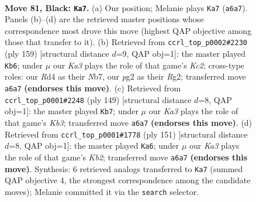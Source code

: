 \documentclass[11pt]{article}
\begin{document}
\clearpage

\begin{figure}[p]\centering
\begin{subfigure}{0.46\textwidth}\centering
\resizebox{\linewidth}{!}{%
\newchessgame
\chessboard[
  setfen={8/8/k7/6K1/3r4/1R6/1N4P1/8 b - - 27 81},
  showmover=false,
  pgfstyle=straightmove, color=movearrow, markmove={a6-a7}
]}
\caption{}
\end{subfigure}\hfill
\begin{subfigure}{0.46\textwidth}\centering
\resizebox{\linewidth}{!}{%
\newchessgame
\chessboard[
  setfen={8/1nk5/8/8/K7/8/6r1/1N1R4 b - - 14 80},
  showmover=false,
  pgfstyle=straightmove, color=movearrow, markmove={c7-b6}
]}
\caption{}
\end{subfigure}
\\[4pt]
\begin{subfigure}{0.46\textwidth}\centering
\resizebox{\linewidth}{!}{%
\newchessgame
\chessboard[
  setfen={8/8/1k2K3/5N2/1p6/7r/5R2/8 b - - 8 75},
  showmover=false,
  pgfstyle=straightmove, color=movearrow, markmove={b6-b7}
]}
\caption{}
\end{subfigure}\hfill
\begin{subfigure}{0.46\textwidth}\centering
\resizebox{\linewidth}{!}{%
\newchessgame
\chessboard[
  setfen={8/1k6/8/p7/8/2N4R/5K2/r7 b - - 1 76},
  showmover=false,
  pgfstyle=straightmove, color=movearrow, markmove={b7-a6}
]}
\caption{}
\end{subfigure}
\caption{\textbf{Move 81, Black: \texttt{Ka7}.} (a) Our position; Melanie plays \texttt{Ka7} (\texttt{a6a7}). Panels (b)--(d) are the retrieved master positions whose correspondence most drove this move (highest QAP objective among those that transfer to it). (b) Retrieved from \texttt{ccrl\_top\_p0002\#2230} (ply 159) [structural distance $d$=9, QAP obj=1]: the master played \texttt{Kb6}; under $\mu$ our \emph{Ka3} plays the role of that game's \emph{Kc2}; cross-type roles: our \emph{R}d4 as their \emph{N}b7, our \emph{p}g2 as their \emph{R}g2; transferred move \texttt{a6a7} \textbf{(endorses this move)}. (c) Retrieved from \texttt{ccrl\_top\_p0001\#2248} (ply 149) [structural distance $d$=8, QAP obj=1]: the master played \texttt{Kb7}; under $\mu$ our \emph{Ka3} plays the role of that game's \emph{Kb3}; transferred move \texttt{a6a7} \textbf{(endorses this move)}. (d) Retrieved from \texttt{ccrl\_top\_p0001\#1778} (ply 151) [structural distance $d$=8, QAP obj=1]: the master played \texttt{Ka6}; under $\mu$ our \emph{Ka3} plays the role of that game's \emph{Kb2}; transferred move \texttt{a6a7} \textbf{(endorses this move)}. Synthesis: 6 retrieved analogs transferred to \texttt{Ka7} (summed QAP objective 4, the strongest correspondence among the candidate moves); Melanie committed it via the \texttt{search} selector.}
\label{fig:thought-m161}
\end{figure}
\end{document}
